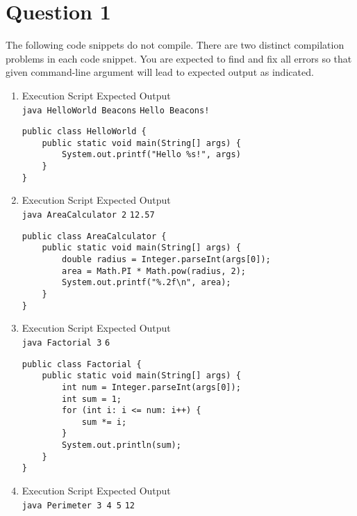 \documentclass[12pt,letterpaper,twoside]{article}
\begin{document}


\section*{Question 1}

The following code snippets do not compile.
There are two distinct compilation problems in each code snippet.
You are expected to find and fix all errors so that given command-line argument will lead to expected output as indicated.

\begin{enumerate}[label=\textbf{(\alph*)}]

\item Execution Script \hfill Expected Output\\
\texttt{java HelloWorld Beacons} \hfill \texttt{Hello Beacons!}

\begin{lstlisting}
public class HelloWorld {
	public static void main(String[] args) {
		System.out.printf("Hello %s!", args)
	}
}
\end{lstlisting}

\item Execution Script \hfill Expected Output\\
\texttt{java AreaCalculator 2} \hfill \texttt{12.57}

\begin{lstlisting}
public class AreaCalculator {
	public static void main(String[] args) {
		double radius = Integer.parseInt(args[0]);
		area = Math.PI * Math.pow(radius, 2);
		System.out.printf("%.2f\n", area);
	}
}
\end{lstlisting}

\newpage

\item Execution Script \hfill Expected Output\\
\texttt{java Factorial 3} \hfill \texttt{6}

\begin{lstlisting}
public class Factorial {
	public static void main(String[] args) {
		int num = Integer.parseInt(args[0]);
		int sum = 1;
		for (int i: i <= num: i++) {
			sum *= i;
		}
		System.out.println(sum);
	}
}
\end{lstlisting}

\item Execution Script \hfill Expected Output\\
\texttt{java Perimeter 3 4 5} \hfill \texttt{12}


\end{enumerate}
\end{document}
